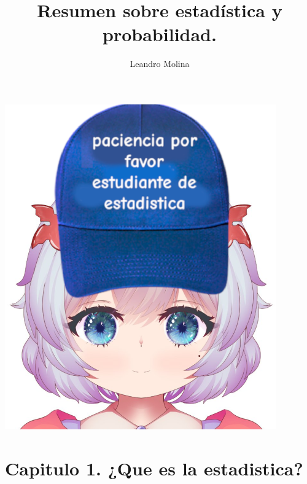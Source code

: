\documentclass[]{article}
\title{Resumen sobre estadística y probabilidad.}
\author{Leandro Molina}
\begin{document}
\maketitle
\vspace{-20pt}

\noindent
\includegraphics[width=\linewidth, height=14cm]{twin_estadistica.png}
\pagebreak

\tableofcontents


\pagebreak
\section{Capitulo 1. ¿Que es la estadistica?}
\end{document}
